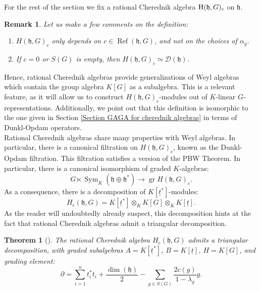 \documentclass{amsart}
\newtheorem{teo}[defi]{ Theorem}
\newtheorem{obs}[defi]{{Remark}}
\newcommand{\D}{\mathcal{D}}
\newcommand{\gr}{\operatorname{gr}}
\begin{document}
For the rest of the section we fix a rational Cherednik algebra $\textnormal{H}(\mathfrak{h},G)_{c}$ on $\mathfrak{h}$.
\begin{obs}
Let us make a few comments on the definition:
    \begin{enumerate}[label=(\roman*)]
        \item  $H(\mathfrak{h},G)_{c}$ only depends on $c\in \operatorname{Ref}(\mathfrak{h},G)$, and not on the choices of $\alpha_g$.
        \item If $c=0$ or $S(G)$ is empty, then $H(\mathfrak{h},G)_{c}\simeq  \D(\mathfrak{h})$.
    \end{enumerate}
\end{obs}
Hence, rational Cherednik algebras provide generalizations of Weyl algebras which contain the group algebra $K[G]$ as a subalgebra. This is a relevant feature, as it will allow us to construct $H(\mathfrak{h},G)_{c}$-modules out of $K$-linear $G$-representations. Additionally, we point out that this definition is isomorphic to the one given in Section \ref{Section GAGA for cherednik algebras} in terms of Dunkl-Opdam operators.\\
Rational Cherednik algebras share many properties with Weyl algebras. In particular, there is a canonical filtration on $H(\mathfrak{h},G)_{c}$, known as the Dunkl-Opdam filtration. This filtration satisfies a version of the PBW Theorem. In particular, there is a canonical isomorphism of graded $K$-algebras:
\begin{equation*}
    G\ltimes \operatorname{Sym}_K(\mathfrak{h}\oplus\mathfrak{h}^*)\rightarrow \gr H(\mathfrak{h},G)_{c}.
\end{equation*}
As a consequence, there is a decomposition of $K[\underline{t}^*]$-modules:
\begin{equation}\label{equation triangular decomposition rational Cher algebra}
    H_{c}(\mathfrak{h},G)=K[\underline{t}^*]\otimes_K K[G] \otimes_K K[\underline{t}].
\end{equation}
As the reader will undoubtedly already suspect, this decomposition hints at the fact that rational Cherednik algebras admit a triangular decomposition. 
\begin{teo}[{\cite[Section 3.2]{ginzburg2003category}}]\label{teo decomposition of a Cherednik algebra}
The rational Cherednik algebra $H_{c}(\mathfrak{h},G)$ admits a triangular decomposition, with graded subalgebras  $A=K[\underline{t}^*]$, $B=K[\underline{t}]$, $H=K[G]$, and grading element:
\begin{equation*}
    \partial = \sum_{i=1}^nt^*_it_i +\frac{\operatorname{dim}(\mathfrak{h})}{2}- \sum_{g\in S(G)}\frac{2c(g)}{1-\lambda_g}g.
\end{equation*}    
\end{teo}
\end{document}
